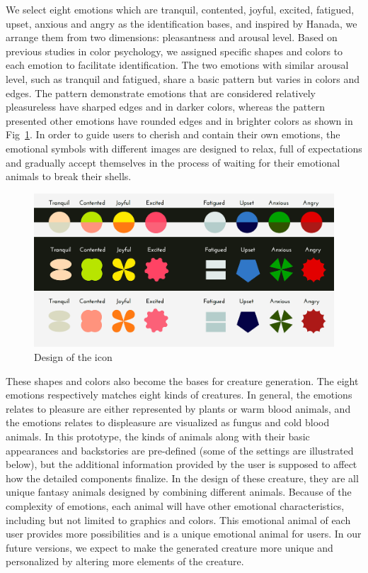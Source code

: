 \documentclass[manuscript,screen]{acmart}
\begin{document}
We select eight emotions which are tranquil, contented, joyful, excited, fatigued, upset, anxious and angry as the identification bases, and inspired by Hanada,\cite{hanada2018correspondence}
we arrange them from two dimensions: pleasantness and arousal level. Based on previous studies in color psychology,\cite{valdez1994effects}
we assigned specific shapes and colors to each emotion to facilitate identification. The two emotions with similar arousal level, such as tranquil and fatigued, share a basic pattern but varies in colors and edges. The pattern demonstrate emotions that are considered relatively pleasureless have sharped edges and in darker colors, whereas the pattern presented other emotions have rounded edges and in brighter colors as shown in Fig~\ref{Icon}. In order to guide users to cherish and contain their own emotions, the emotional symbols with different images are designed to relax, full of expectations and gradually accept themselves in the process of waiting for their emotional animals to break their shells.

\begin{figure}[h]
  \centering
  \includegraphics[width=\linewidth]{Icon.png}
  \caption{Design of the icon}
  \label{Icon}
\end{figure}

These shapes and colors also become the bases for creature generation. The eight emotions respectively matches eight kinds of creatures. In general, the emotions relates to pleasure are either represented by plants or warm blood animals, and the emotions relates to displeasure are visualized as fungus and cold blood animals. In this prototype, the kinds of animals along with their basic appearances and backstories are pre-defined (some of the settings are illustrated below), but the additional information provided by the user is supposed to affect how the detailed components finalize. In the design of these creature, they are all unique fantasy animals designed by combining different animals. Because of the complexity of emotions, each animal will have other emotional characteristics, including but not limited to graphics and colors. This emotional animal of each user provides more possibilities and is a unique emotional animal for users. In our future versions, we expect to make the generated creature more unique and personalized by altering more elements of the creature.
\end{document}
